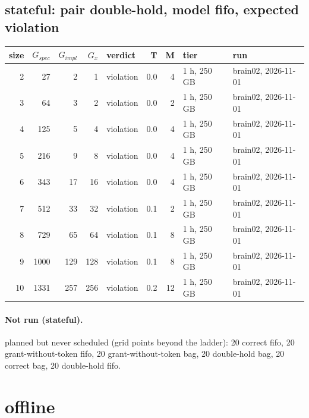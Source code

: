 \documentclass[10pt]{article}
\begin{document}
\subsection*{stateful: pair \textsf{double-hold}, model fifo, expected violation}
\begin{longtable}{@{}rrrrlrrll@{}}
\toprule
size & $G_{\mathit{spec}}$ & $G_{\mathit{impl}}$ & $G_x$ & verdict & T & M & tier & run \\
\midrule
\endhead
\color{blue} 2 & 27 & 2 & 1 & violation & 0.0 & 4 & 1 h, 250 GB & brain02, 2026-11-01 \\
\color{blue} 3 & 64 & 3 & 2 & violation & 0.0 & 2 & 1 h, 250 GB & brain02, 2026-11-01 \\
\color{blue} 4 & 125 & 5 & 4 & violation & 0.0 & 4 & 1 h, 250 GB & brain02, 2026-11-01 \\
\color{blue} 5 & 216 & 9 & 8 & violation & 0.0 & 4 & 1 h, 250 GB & brain02, 2026-11-01 \\
\color{blue} 6 & 343 & 17 & 16 & violation & 0.0 & 4 & 1 h, 250 GB & brain02, 2026-11-01 \\
\color{blue} 7 & 512 & 33 & 32 & violation & 0.1 & 2 & 1 h, 250 GB & brain02, 2026-11-01 \\
\color{blue} 8 & 729 & 65 & 64 & violation & 0.1 & 8 & 1 h, 250 GB & brain02, 2026-11-01 \\
\color{blue} 9 & 1000 & 129 & 128 & violation & 0.1 & 8 & 1 h, 250 GB & brain02, 2026-11-01 \\
\color{blue} 10 & 1331 & 257 & 256 & violation & 0.2 & 12 & 1 h, 250 GB & brain02, 2026-11-01 \\
\bottomrule
\end{longtable}
\paragraph{Not run (stateful).}
planned but never scheduled (grid points beyond the ladder): 20 correct fifo, 20 grant-without-token fifo, 20 grant-without-token bag, 20 double-hold bag, 20 correct bag, 20 double-hold fifo.\par
\section*{offline}
\end{document}
